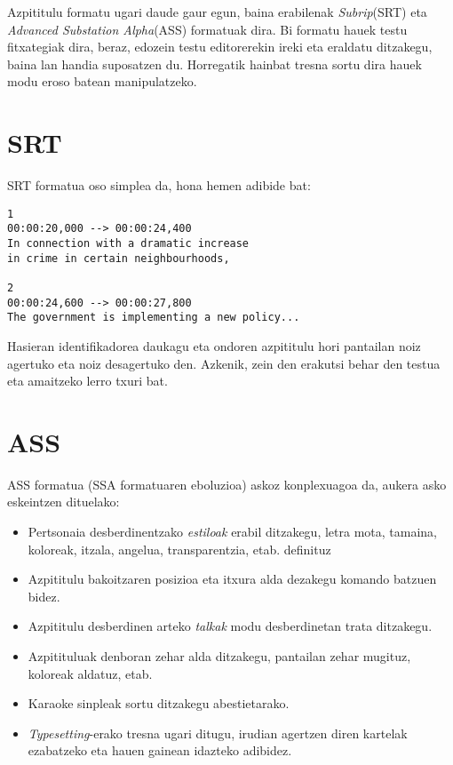 
Azpititulu formatu ugari daude gaur egun, baina erabilenak \textit{Subrip}(SRT) eta \textit{Advanced Substation Alpha}(ASS) formatuak dira. Bi formatu hauek testu fitxategiak dira, beraz, edozein testu editorerekin ireki eta eraldatu ditzakegu, baina lan handia suposatzen du. Horregatik hainbat tresna sortu dira hauek modu eroso batean manipulatzeko.

\section{SRT}
SRT formatua oso simplea da, hona hemen adibide bat:
\begin{verbatim}
1
00:00:20,000 --> 00:00:24,400
In connection with a dramatic increase
in crime in certain neighbourhoods,

2
00:00:24,600 --> 00:00:27,800
The government is implementing a new policy...
\end{verbatim}

Hasieran identifikadorea daukagu eta ondoren azpititulu hori pantailan noiz agertuko eta noiz desagertuko den. Azkenik, zein den erakutsi behar den testua eta amaitzeko lerro txuri bat.

\section{ASS}
ASS formatua (SSA formatuaren eboluzioa) askoz konplexuagoa da, aukera asko eskeintzen dituelako:

\begin{itemize}
\item Pertsonaia desberdinentzako \textit{estiloak} erabil ditzakegu, letra mota, tamaina, koloreak, itzala, angelua, transparentzia, etab. definituz
\item Azpititulu bakoitzaren posizioa eta itxura alda dezakegu komando batzuen bidez.
\item Azpititulu desberdinen arteko \textit{talkak} modu desberdinetan trata ditzakegu.
\item Azpitituluak denboran zehar alda ditzakegu, pantailan zehar mugituz, koloreak aldatuz, etab.
\item Karaoke sinpleak sortu ditzakegu abestietarako.
\item \textit{Typesetting}-erako tresna ugari ditugu, irudian agertzen diren kartelak ezabatzeko eta hauen gainean idazteko adibidez.
\end{itemize}

